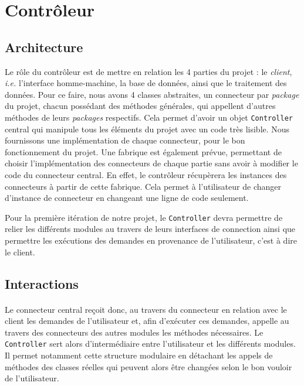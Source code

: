 
\section{Contrôleur}
\subsection{Architecture}

Le rôle du contrôleur est de mettre en relation les 4 parties du projet : le \textit{client}, \textit{i.e.} l'interface homme-machine, la base de données, ainsi que le traitement des données. Pour ce faire, nous avons 4 classes abstraites, un connecteur par \textit{package} du projet, chacun possédant des méthodes générales, qui appellent d'autres méthodes de leurs \textit{packages} respectifs. Cela permet d'avoir un objet \texttt{Controller} central qui manipule tous les éléments du projet avec un code très lisible. Nous fournissons une implémentation de chaque connecteur, pour le bon fonctionnement du projet. Une fabrique est également prévue, permettant de choisir l'implémentation des connecteurs de chaque partie sans avoir à modifier le code du connecteur central. En effet, le contrôleur récupèrera les instances des connecteurs à partir de cette fabrique. Cela permet à l'utilisateur de changer d'instance de connecteur en changeant une ligne de code seulement.

Pour la première itération de notre projet, le \texttt{Controller} devra permettre de relier les différents modules au travers de leurs interfaces de connection ainsi que permettre les exécutions des demandes en provenance de l'utilisateur, c'est à dire le client. 

\subsection{Interactions}
\paragraph{}
Le connecteur central reçoit donc, au travers du connecteur en relation avec le client les demandes de l'utilisateur et, afin d'exécuter ces demandes, appelle au travers des connecteurs des autres modules les méthodes nécessaires. Le \texttt{Controller} sert alors d'intermédiaire entre l'utilisateur et les différents modules. Il permet notamment cette structure modulaire en détachant les appels de méthodes des classes réelles qui peuvent alors être changées selon le bon vouloir de l'utilisateur.
